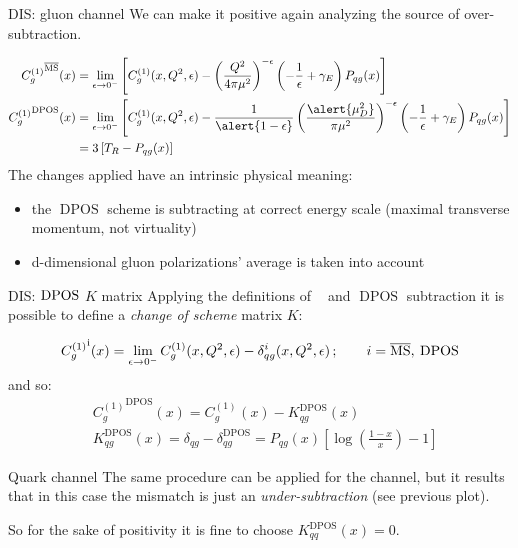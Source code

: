 \documentclass[9pt]{beamer}
\DeclareMathOperator{\msbar}{\overline{MS}}
\DeclareMathOperator{\dpos}{DPOS}
\begin{document}
\begin{frame}{DIS: gluon channel}
    We can make it positive again analyzing the source of over-subtraction.

    \begin{align*}\label{eq:cgren}
        {C^{(1)}_{g}}^{\msbar}(x) &= \lim_{\epsilon\to
        0^-}\left[C_{g}^{(1)}(x,Q^2,\epsilon) - \left(\frac{Q^2}{4\pi
        \mu^2}\right)^{-\epsilon} \left(-\frac 1
        {\epsilon}+\gamma_E\right) P_{qg}(x)\right]\\
        {C^{(1)}_{g}}^{\dpos}(x) &= \lim_{\epsilon\to0^-}
        \left[{C^{(1)}_{g}}(x,Q^2,\epsilon) -
        \frac{1}{\alert{1-\epsilon}}\left(\frac{\alert{\mu_D^2}}{\pi\mu^2}\right)^{-\epsilon}
        \left(-\frac 1 {\epsilon}+\gamma_E\right) P_{qg}(x)\right]\\
        &= 3\left[ T_R- P_{qg}(x)\right]
    \end{align*}
    The changes applied have an intrinsic physical meaning:
    \begin{itemize}
        \item the $\dpos$ scheme is subtracting at correct energy scale (maximal transverse momentum, not virtuality)
        \item d-dimensional gluon polarizations' average is taken into account
    \end{itemize}
\end{frame}

\begin{frame}{DIS: ${\tiny \dpos}$ $K$ matrix}
    Applying the definitions of $\msbar$ and $\dpos$ subtraction it is possible
    to define a \textit{change of scheme} matrix $K$:

    \begin{equation*}\label{eq:renorm}
        {C^{(1)}_{g}}^{\rm i}(x) = \lim_{\epsilon\to0^-} {C^{(1)}_{g}}(x,Q^2,\epsilon)
        -\delta_{qg}^i(x,Q^2,\epsilon)\,;\qquad i=\msbar,\> {\tiny\dpos}
    \end{equation*}
    and so:
    \begin{align*}\label{eq:count}
      &   {C^{(1)}_{g}}^{\dpos}(x) =  {C^{(1)}_{g}}^{\msbar}(x) -
      K_{qg}^{\dpos}(x) \,\\
      &  K_{qg}^{\dpos}(x)=\delta_{qg}^{\msbar}-\delta_{qg}^{\dpos}=  P_{qg}(x)\left[\log(\frac{1-x}{x}) - 1\right]
    \end{align*}

    \begin{block}{Quark channel}
    The same procedure can be applied for the \Pq channel, but it results that
    in this case the mismatch is just an \textit{under-subtraction} (see
    previous plot).

    So for the sake of positivity it is fine to choose $K_{qq}^{\dpos}(x) = 0$.
    \end{block}
\end{frame}
\end{document}
